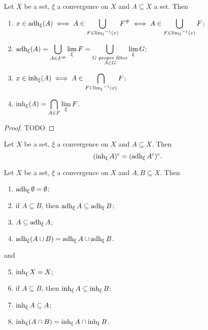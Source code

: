 \begin{proposition}
Let $X$ be a set, $\xi$ a convergence on $X$ and $A \subseteq X$ a set. Then
\begin{enumerate}
\item $\displaystyle x\in \operatorname{adh}_\xi(A) \iff A \in \bigcup_{F\in {\lim_\xi}^{-1}(x)} F^{\mathrel{\#}} \iff A \in \bigcup_{F\in {\lim_\xi}^{-1}(x)} F$;
\item $\displaystyle \operatorname{adh}_\xi(A) = \bigcup_{A \in F^{\mathrel{\#}}}\lim_\xi F = \bigcup_{\substack{\text{$G$ proper filter} \\ A\in G}} \lim_\xi G$;
\item $\displaystyle x\in \operatorname{inh}_\xi(A) \iff A \in \bigcap_{F\in {\lim_\xi}^{-1}(x)} F$;
\item $\displaystyle \operatorname{inh}_\xi(A) = \bigcap_{A \in F}\lim_\xi F$.
\end{enumerate}
\end{proposition}
\begin{proof}
TODO
\end{proof}
\begin{corollary}
Let $X$ be a set, $\xi$ a convergence on $X$ and $A \subseteq X$. Then
\[ (\operatorname{inh}_\xi A)^c = (\operatorname{adh}_\xi A^c)^c. \]
\end{corollary}
\begin{corollary}
Let $X$ be a set, $\xi$ a convergence on $X$ and $A,B \subseteq X$. Then
\begin{enumerate}
\item $\operatorname{adh}_\xi \emptyset = \emptyset$;
\item if $A \subseteq B$, then $\operatorname{adh}_\xi A \subseteq \operatorname{adh}_\xi B$;
\item $A\subseteq \operatorname{adh}_\xi A$;
\item $\operatorname{adh}_\xi(A\cup B) = \operatorname{adh}_\xi A \cup \operatorname{adh}_\xi B$.
\end{enumerate}
and
\begin{enumerate} \setcounter{enumi}{4}
\item $\operatorname{inh}_\xi X = X$;
\item if $A \subseteq B$, then $\operatorname{inh}_\xi A \subseteq \operatorname{inh}_\xi B$;
\item $\operatorname{inh}_\xi A \subseteq A$;
\item $\operatorname{inh}_\xi(A\cap B) = \operatorname{inh}_\xi A \cap \operatorname{inh}_\xi B$.
\end{enumerate}
\end{corollary}

